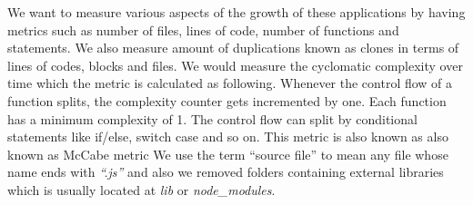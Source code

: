We want to measure various aspects of the growth of these applications by having metrics such as number of files, lines of code, number of functions and statements. We also measure amount of duplications known as clones in terms of lines of codes, blocks and files. We would measure the cyclomatic complexity over time which the metric is calculated as following. Whenever the control flow of a function splits, the complexity counter gets incremented by one. Each function has a minimum complexity of 1. The control flow can split by conditional statements like if/else, switch case and so on. This metric is also known as also known as McCabe metric
We use the term “source file” to mean any file whose name ends with \textit{“.js”} and also we removed folders containing external libraries which is usually located at \textit{lib} or \textit{node\_modules}. 
